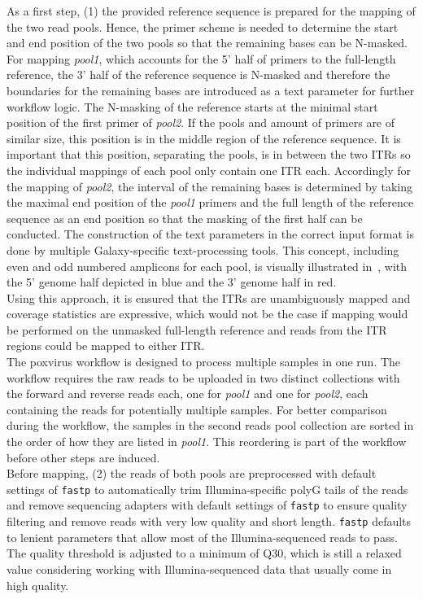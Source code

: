 As a first step, (1) the provided reference sequence is prepared for the mapping of the two read pools. Hence, the primer scheme is needed to determine the start and end position of the two pools so that the remaining bases can be N-masked. For mapping \textit{pool1}, which accounts for the 5' half of primers to the full-length reference, the 3' half of the reference sequence is N-masked and therefore the boundaries for the remaining bases are introduced as a text parameter for further workflow logic. The N-masking of the reference starts at the minimal start position of the first primer of \textit{pool2}. If the pools and amount of primers are of similar size, this position is in the middle region of the reference sequence. It is important that this position, separating the pools, is in between the two \acp{ITR} so the individual mappings of each pool only contain one \ac{ITR} each. Accordingly for the mapping of \textit{pool2}, the interval of the remaining bases is determined by taking the maximal end position of the \textit{pool1} primers and the full length of the reference sequence as an end position so that the masking of the first half can be conducted. The construction of the text parameters in the correct input format is done by multiple Galaxy-specific text-processing tools. This concept, including even and odd numbered amplicons for each pool, is visually illustrated in~, with the 5' genome half depicted in blue and the 3' genome half in red. \\
Using this approach, it is ensured that the \acp{ITR} are unambiguously mapped and coverage statistics are expressive, which would not be the case if mapping would be performed on the unmasked full-length reference and reads from the \ac{ITR} regions could be mapped to either \ac{ITR}.\\
The poxvirus workflow is designed to process multiple samples in one run. The workflow requires the raw reads to be uploaded in two distinct collections with the forward and reverse reads each, one for \textit{pool1} and one for \textit{pool2}, each containing the reads for potentially multiple samples. For better comparison during the workflow, the samples in the second reads pool collection are sorted in the order of how they are listed in \textit{pool1}. This reordering is part of the workflow before other steps are induced.\\
Before mapping, (2) the reads of both pools are preprocessed with default settings of \texttt{fastp} to automatically trim Illumina-specific polyG tails of the reads and remove sequencing adapters with default settings of \texttt{fastp} to ensure quality filtering and remove reads with very low quality and short length. \texttt{fastp} defaults to lenient parameters that allow most of the Illumina-sequenced reads to pass. The quality threshold is adjusted to a minimum of Q30, which is still a relaxed value considering working with Illumina-sequenced data that usually come in high quality.\\
